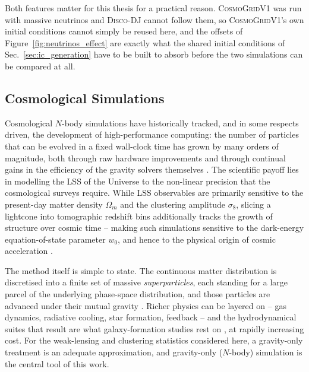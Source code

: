 \documentclass{report}
\begin{document}
Both features matter for this thesis for a practical reason. \textsc{CosmoGridV1} was run with massive neutrinos and \textsc{Disco-DJ} cannot follow them, so \textsc{CosmoGridV1}'s own initial conditions cannot simply be reused here, and the offsets of Figure~\ref{fig:neutrinos_effect} are exactly what the shared initial conditions of Sec.~\ref{sec:ic_generation} have to be built to absorb before the two simulations can be compared at all.

\subsection{Cosmological Simulations}
\label{sec:cosmo_sims}

Cosmological $N$-body simulations have historically tracked, and in some respects driven, the development of high-performance computing: the number of particles that can be evolved in a fixed wall-clock time has grown by many orders of magnitude, both through raw hardware improvements and through continual gains in the efficiency of the gravity solvers themselves \cite{potter_pkdgrav3_2016}. The scientific payoff lies in modelling the LSS of the Universe to the non-linear precision that the cosmological surveys require. While LSS observables are primarily sensitive to the present-day matter density $\Omega_m$ and the clustering amplitude $\sigma_8$, slicing a lightcone into tomographic redshift bins additionally tracks the growth of structure over cosmic time -- making such simulations sensitive to the dark-energy equation-of-state parameter $w_0$, and hence to the physical origin of cosmic acceleration \cite{kacprzak_cosmogridv1_2023}.

The method itself is simple to state. The continuous matter distribution is discretised into a finite set of massive \emph{superparticles}, each standing for a large parcel of the underlying phase-space distribution, and those particles are advanced under their mutual gravity \cite{dehnen_n-body_2011}. Richer physics can be layered on -- gas dynamics, radiative cooling, star formation, feedback -- and the hydrodynamical suites that result are what galaxy-formation studies rest on \cite{vogelsberger_cosmological_2019}, at rapidly increasing cost. For the weak-lensing and clustering statistics considered here, a gravity-only treatment is an adequate approximation, and gravity-only (\mbox{$N$}-body) simulation is the central tool of this work.
\end{document}
